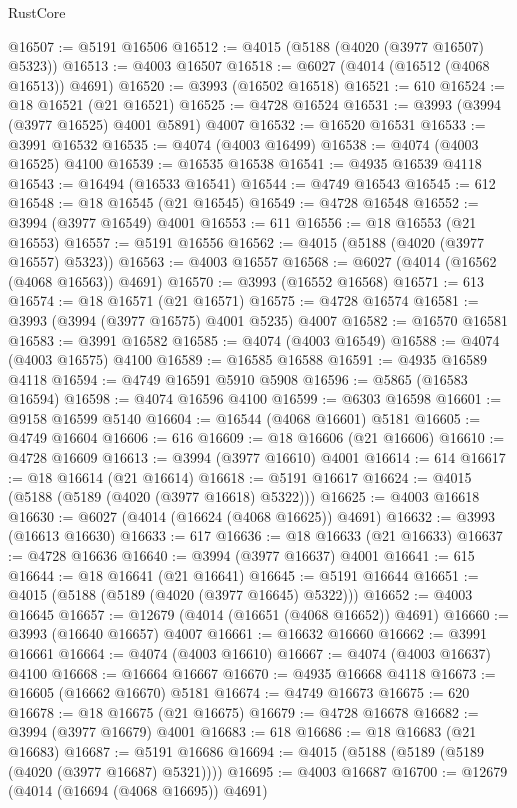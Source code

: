 \begin{lexlean}{RustCore}
\begin{coremodule}
@16507 := @5191 @16506
@16512 := @4015 (@5188 (@4020 (@3977 @16507) @5323))
@16513 := @4003 @16507
@16518 := @6027 (@4014 (@16512 (@4068 @16513)) @4691)
@16520 := @3993 (@16502 @16518)
@16521 := 610
@16524 := @18 @16521 (@21 @16521)
@16525 := @4728 @16524
@16531 := @3993 (@3994 (@3977 @16525) @4001 @5891) @4007
@16532 := @16520 @16531
@16533 := @3991 @16532
@16535 := @4074 (@4003 @16499)
@16538 := @4074 (@4003 @16525) @4100
@16539 := @16535 @16538
@16541 := @4935 @16539 @4118
@16543 := @16494 (@16533 @16541)
@16544 := @4749 @16543
@16545 := 612
@16548 := @18 @16545 (@21 @16545)
@16549 := @4728 @16548
@16552 := @3994 (@3977 @16549) @4001
@16553 := 611
@16556 := @18 @16553 (@21 @16553)
@16557 := @5191 @16556
@16562 := @4015 (@5188 (@4020 (@3977 @16557) @5323))
@16563 := @4003 @16557
@16568 := @6027 (@4014 (@16562 (@4068 @16563)) @4691)
@16570 := @3993 (@16552 @16568)
@16571 := 613
@16574 := @18 @16571 (@21 @16571)
@16575 := @4728 @16574
@16581 := @3993 (@3994 (@3977 @16575) @4001 @5235) @4007
@16582 := @16570 @16581
@16583 := @3991 @16582
@16585 := @4074 (@4003 @16549)
@16588 := @4074 (@4003 @16575) @4100
@16589 := @16585 @16588
@16591 := @4935 @16589 @4118
@16594 := @4749 @16591 @5910 @5908
@16596 := @5865 (@16583 @16594)
@16598 := @4074 @16596 @4100
@16599 := @6303 @16598
@16601 := @9158 @16599 @5140
@16604 := @16544 (@4068 @16601) @5181
@16605 := @4749 @16604
@16606 := 616
@16609 := @18 @16606 (@21 @16606)
@16610 := @4728 @16609
@16613 := @3994 (@3977 @16610) @4001
@16614 := 614
@16617 := @18 @16614 (@21 @16614)
@16618 := @5191 @16617
@16624 := @4015 (@5188 (@5189 (@4020 (@3977 @16618) @5322)))
@16625 := @4003 @16618
@16630 := @6027 (@4014 (@16624 (@4068 @16625)) @4691)
@16632 := @3993 (@16613 @16630)
@16633 := 617
@16636 := @18 @16633 (@21 @16633)
@16637 := @4728 @16636
@16640 := @3994 (@3977 @16637) @4001
@16641 := 615
@16644 := @18 @16641 (@21 @16641)
@16645 := @5191 @16644
@16651 := @4015 (@5188 (@5189 (@4020 (@3977 @16645) @5322)))
@16652 := @4003 @16645
@16657 := @12679 (@4014 (@16651 (@4068 @16652)) @4691)
@16660 := @3993 (@16640 @16657) @4007
@16661 := @16632 @16660
@16662 := @3991 @16661
@16664 := @4074 (@4003 @16610)
@16667 := @4074 (@4003 @16637) @4100
@16668 := @16664 @16667
@16670 := @4935 @16668 @4118
@16673 := @16605 (@16662 @16670) @5181
@16674 := @4749 @16673
@16675 := 620
@16678 := @18 @16675 (@21 @16675)
@16679 := @4728 @16678
@16682 := @3994 (@3977 @16679) @4001
@16683 := 618
@16686 := @18 @16683 (@21 @16683)
@16687 := @5191 @16686
@16694 := @4015 (@5188 (@5189 (@5189 (@4020 (@3977 @16687) @5321))))
@16695 := @4003 @16687
@16700 := @12679 (@4014 (@16694 (@4068 @16695)) @4691)

\end{coremodule}
\end{lexlean}
